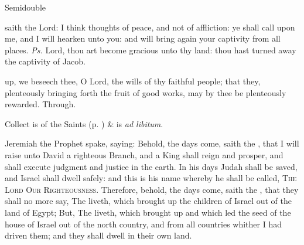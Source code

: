 \begin{inhead}
{Semidouble}
\end{inhead}
\par\noindent
{}




\properantiphonfix

\introit
{} saith the Lord: I think thoughts of peace, and not of affliction: ye shall call upon me, and I will hearken unto you: and will bring again your captivity from all places. \textit{Ps.} Lord, thou art become gracious unto thy land: thou hast turned away the captivity of Jacob.

\collect
{} up, we beseech thee, O Lord, the wills of thy faithful people; that they, plenteously bringing forth the fruit of good works, may by thee be plenteously rewarded. Through.
\begin{rubric}
     Collect is of the Saints (p. \pageref{SPSaints}) \&  is \emph{ad libitum}.
\end{rubric}

 Jeremiah the Prophet spake, saying: Behold, the days come, saith the , that I will raise unto David a righteous Branch, and a King shall reign and prosper, and shall execute judgment and justice in the earth. In his days Judah shall be saved, and Israel shall dwell safely: and this is his name whereby he shall be called, \textsc{The Lord Our Righteousness}. Therefore, behold, the days come, saith the , that they shall no more say, The  liveth, which brought up the children of Israel out of the land of Egypt; But, The  liveth, which brought up and which led the seed of the house of Israel out of the north country, and from all countries whither I had driven them; and they shall dwell in their own land.


